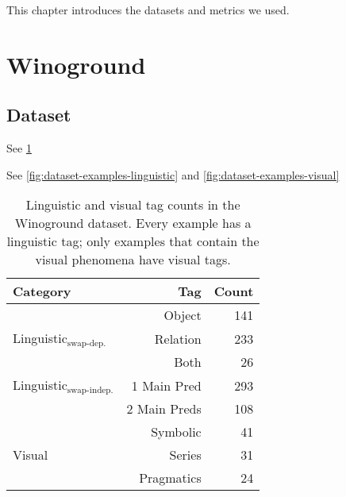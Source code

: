 This chapter introduces the datasets and metrics we used.

\section{Winoground}

\subsection{Dataset}

See \cref{tab:stats-tag-subset}

See \cref{fig:dataset-examples-linguistic} and \cref{fig:dataset-examples-visual}

\begin{table}
\centering
\begin{tabular}{lrr}
\toprule
 Category & Tag    &   Count \\
\midrule
 & Object   &     141 \\
 Linguistic$_\text{swap-dep.}$ & Relation &     233 \\
 & Both &      26 \\\midrule
 Linguistic$_\text{swap-indep.}$ & 1 Main Pred & 293 \\
 & 2 Main Preds & 108 \\\midrule
 & Symbolic &  41 \\
 Visual & Series &  31 \\
 & Pragmatics &  24\\
\bottomrule
\end{tabular}
\caption{Linguistic and visual tag counts in the Winoground dataset. Every example has a linguistic tag; only examples that contain the visual phenomena have visual tags.}
\label{tab:stats-tag-subset}
\end{table}

